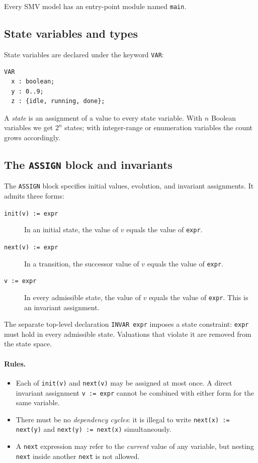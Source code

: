 Every SMV model has an entry-point module named \texttt{main}.

\subsection{State variables and types}
\label{sec:smv-vars}

State variables are declared under the keyword \texttt{VAR}:

\begin{verbatim}
VAR
  x : boolean;
  y : 0..9;
  z : {idle, running, done};
\end{verbatim}

A \emph{state} is an assignment of a value to every state variable.  With
$n$ Boolean variables we get $2^n$ states; with integer-range or enumeration
variables the count grows accordingly.

\subsection{The \texttt{ASSIGN} block and invariants}
\label{sec:smv-assign}

The \texttt{ASSIGN} block specifies initial values, evolution, and invariant
assignments.  It admits three forms:

\begin{description}
  \item[\texttt{init(v) := expr}] In an initial state, the value of $v$
        equals the value of \texttt{expr}.
  \item[\texttt{next(v) := expr}] In a transition, the successor value of
        $v$ equals the value of \texttt{expr}.
  \item[\texttt{v := expr}] In every admissible state, the value of $v$
        equals the value of \texttt{expr}.  This is an invariant assignment.
\end{description}

The separate top-level declaration \texttt{INVAR expr} imposes a state
constraint: \texttt{expr} must hold in every admissible state.  Valuations
that violate it are removed from the state space.

\paragraph{Rules.}
\begin{itemize}
  \item Each of \texttt{init(v)} and \texttt{next(v)} may be assigned at
        most once.  A direct invariant assignment \texttt{v := expr} cannot
        be combined with either form for the same variable.
  \item There must be no \emph{dependency cycles}: it is illegal to write
        \texttt{next(x) := next(y)} and \texttt{next(y) := next(x)}
        simultaneously.
  \item A \texttt{next} expression may refer to the \emph{current} value of
        any variable, but nesting \texttt{next} inside another \texttt{next}
        is not allowed.
\end{itemize}

